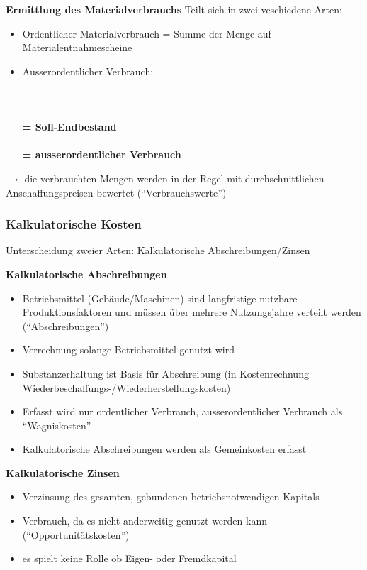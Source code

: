 \documentclass[a4paper,11pt, twoside]{article}
\newcommand\mpar[1]{\marginpar {\flushleft\small #1}}
\begin{document}
\textbf{Ermittlung des Materialverbrauchs}
Teilt sich in zwei veschiedene Arten:
	\mpar{\textcolor{red}{Kann ermittelt werden (bspw. durch Auftrag)}}
\begin{itemize}
	\item Ordentlicher Materialverbrauch = Summe der Menge auf Materialentnahmescheine
	\item Ausserordentlicher Verbrauch:\\
			\\
			\\
			\\
			\textbf{= Soll-Endbestand}\\
			\\
			\textbf{= ausserordentlicher Verbrauch}\\
\end{itemize}
	\mpar{\textcolor{red}{Inventur ist nötig}}
$\rightarrow$ die verbrauchten Mengen werden in der Regel mit durchschnittlichen Anschaffungspreisen bewertet ("`Verbrauchswerte"')

\subsubsection*{Kalkulatorische Kosten}
Unterscheidung zweier Arten: Kalkulatorische Abschreibungen/Zinsen


\textbf{Kalkulatorische Abschreibungen}
\begin{itemize}
	\item Betriebsmittel (Gebäude/Maschinen) sind langfristige nutzbare Produktionsfaktoren und müssen über mehrere Nutzungsjahre verteilt werden ("`Abschreibungen"')
	\item Verrechnung solange Betriebsmittel genutzt wird
	\item Substanzerhaltung ist Basis für Abschreibung (in Kostenrechnung Wiederbeschaffungs-/Wiederherstellungskosten)
	\item Erfasst wird nur ordentlicher Verbrauch, ausserordentlicher Verbrauch als "`Wagniskosten"'
	\item Kalkulatorische Abschreibungen werden als Gemeinkosten erfasst
\end{itemize}

\textbf{Kalkulatorische Zinsen}
\begin{itemize}
	\item Verzinsung des gesamten, gebundenen betriebsnotwendigen Kapitals
	\item Verbrauch, da es nicht anderweitig genutzt werden kann ("`Opportunitätskosten"')
	\item es spielt keine Rolle ob Eigen- oder Fremdkapital
\end{itemize}
\end{document}
